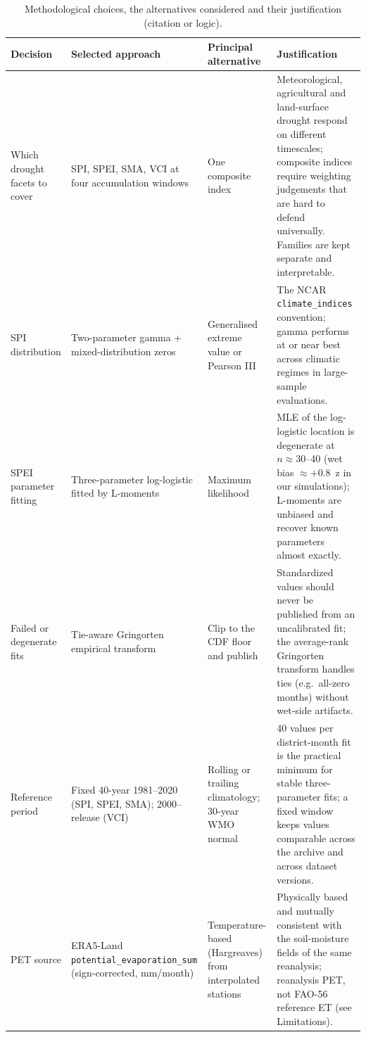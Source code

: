 \documentclass[10pt,a4paper]{article}
\begin{document}
\begin{table}[t]
\caption{Methodological choices, the alternatives considered and their justification (citation or logic).}
\label{tab:choices}
\footnotesize
\begin{tabularx}{\textwidth}{@{}p{}p{}p{}X@{}}
\toprule
Decision & Selected approach & Principal alternative & Justification \\
\midrule
Which drought facets to cover & SPI, SPEI, SMA, VCI at four accumulation windows & One composite index & Meteorological, agricultural and land-surface drought respond on different timescales\citep{WilhiteGlantz1985,MishraSingh2010}; composite indices require weighting judgements that are hard to defend universally\citep{HaoSingh2015}. Families are kept separate and interpretable\citep{SvobodaFuchs2016}. \\
SPI distribution & Two-parameter gamma + mixed-distribution zeros & Generalised extreme value or Pearson III & The NCAR \texttt{climate\_indices} convention\citep{McKee1993}; gamma performs at or near best across climatic regimes in large-sample evaluations\citep{Stagge2015}. \\
SPEI parameter fitting & Three-parameter log-logistic fitted by L-moments & Maximum likelihood & MLE of the log-logistic location is degenerate at $n\approx30$--40 (wet bias $\approx+0.8$~z in our simulations); L-moments are unbiased and recover known parameters almost exactly\citep{Begueria2014,Hosking1990}. \\
Failed or degenerate fits & Tie-aware Gringorten empirical transform & Clip to the CDF floor and publish & Standardized values should never be published from an uncalibrated fit\citep{Stagge2015}; the average-rank Gringorten transform\citep{Gringorten1963} handles ties (e.g.\ all-zero months) without wet-side artifacts. \\
Reference period & Fixed 40-year 1981--2020 (SPI, SPEI, SMA); 2000--release (VCI) & Rolling or trailing climatology; 30-year WMO normal & 40 values per district-month fit is the practical minimum for stable three-parameter fits; a fixed window keeps values comparable across the archive and across dataset versions\citep{WMOLincoln2009,SvobodaFuchs2016}. \\
PET source & ERA5-Land \texttt{potential\_evaporation\_sum} (sign-corrected, mm/month) & Temperature-based (Hargreaves) from interpolated stations & Physically based and mutually consistent with the soil-moisture fields of the same reanalysis\citep{MunozSabater2021}; reanalysis PET, not FAO-56 reference ET (see Limitations). \\

\end{tabularx}
\end{table}
\end{document}
